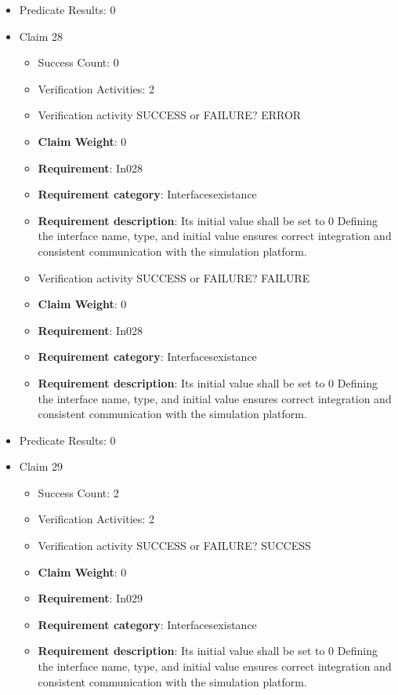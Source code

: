 \documentclass{article}
\begin{document}
\begin{itemize}
									    
				\item Predicate Results: 0

  				  \item Claim 28
				\begin{itemize}
			    	\item Success Count: 0 
			    	\item Verification Activities: 2
					\item Verification activity SUCCESS or FAILURE? ERROR
					\item \textbf{Claim Weight}: 0
						\item \textbf{Requirement}: In028 
						\item \textbf{Requirement category}: Interfacesexistance 
						\item \textbf{Requirement description}: Its initial value shall be set to 0 Defining the interface name, type, and initial value ensures correct integration and consistent communication with the simulation platform.
					
					\item Verification activity SUCCESS or FAILURE? FAILURE
					\item \textbf{Claim Weight}: 0
						\item \textbf{Requirement}: In028 
						\item \textbf{Requirement category}: Interfacesexistance 
						\item \textbf{Requirement description}: Its initial value shall be set to 0 Defining the interface name, type, and initial value ensures correct integration and consistent communication with the simulation platform.
					
				\end{itemize}
				
									    
				\item Predicate Results: 0

  				  \item Claim 29
				\begin{itemize}
			    	\item Success Count: 2 
			    	\item Verification Activities: 2
					\item Verification activity SUCCESS or FAILURE? SUCCESS
					\item \textbf{Claim Weight}: 0
						\item \textbf{Requirement}: In029 
						\item \textbf{Requirement category}: Interfacesexistance 
						\item \textbf{Requirement description}: Its initial value shall be set to 0 Defining the interface name, type, and initial value ensures correct integration and consistent communication with the simulation platform.
					

\end{itemize}
\end{itemize}
\end{document}
